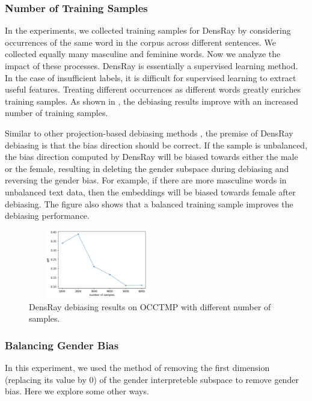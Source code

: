 \subsubsection{Number of Training Samples}
In the experiments, we collected training samples for
DensRay by considering occurrences of the same word in the
corpus across different sentences. We collected equally many
masculine and feminine words. Now we analyze the impact of
these processes.  DensRay is essentially a supervised
learning method. In the case of insufficient labels, it is
difficult for supervised learning to extract useful
features. Treating different occurrences as different words
greatly enriches training samples. As shown in
, the debiasing results improve with an
increased number of training samples.

Similar to other projection-based debiasing methods
\citep{bolukbasi2016man,zhao2019gender,dev2019attenuating,
  karve2019conceptor}, the premise of DensRay debiasing is
that the bias direction should be correct. If the sample is
unbalanced, the bias direction computed by DensRay will be
biased towards either the male or the female, resulting in
deleting the gender subspace during debiasing and reversing
the gender bias. For example, if there are more masculine words in
unbalanced text data, then the embeddings will be biased
towards female after debiasing. The figure also shows that
a balanced training sample improves the debiasing
performance.
\begin{figure}[ht]
    \centering
    \includegraphics[width=6cm,height=3cm]{samples}
    \caption{DensRay debiasing results on OCCTMP with different number of samples.}
\end{figure}

\subsubsection{Balancing Gender Bias}
In this experiment, we used the method of removing the first dimension (replacing its value by $0$) of the gender interpreteble subspace to remove gender bias. Here we explore some other ways.

